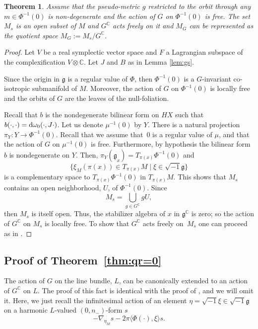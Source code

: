 \documentclass[pdftex]{sigma}
\numberwithin{equation}{section}
\newtheorem{Theorem}{Theorem}[section]
\begin{document}
 	\begin{Theorem}
 		Assume that the pseudo-metric $g$ restricted to the orbit through any $m\in \Phi^{-1}(0)$ is non-degenerate and the action of $G$ on $\Phi^{-1}(0)$ is free.
 		The set $M_s$ is an open subset of $M$ and $G^{\mathbb{C}}$ acts freely on it and $M_G$ can be represented as the quotient space $M_G:=M_s/G^{\mathbb{C}}$.
 	\end{Theorem}
 	\begin{proof}
 		Let $V$ be a real symplectic vector space and $F$ a	Lagrangian subspace of the complexification $V\otimes \mathbb{C}$. Let $J$ and $B$ as in Lemma \ref{lem:gs}.

 		Since the origin in $\mathfrak{g}$ is a regular value of $\Phi$, then $\Phi^{-1}(0)$ is a $G$-invariant co-isotropic submanifold of $M$. Moreover, the action of $G$ on $\Phi^{-1}(0)$ is locally free and the orbits of $G$ are the leaves of the null-foliation.
 		
 		Recall that $b$ is the nondegenerate bilinear form on $HX$ such that
$b(\cdot , \cdot) = {\rm d}\omega_0(\cdot , J\cdot)$.
 		Let us denote $\mu^{-1}(0)$ by $Y$. There is a natural projection $\pi_Y \colon Y\rightarrow \Phi^{-1}(0)$. Recall that we assume that~$0$ is a regular value of $\mu$, and that the action of $G$ on $\mu^{-1}(0)$ is free. Furthermore, by hypothesis the bilinear form~$b$ is nondegenerate on $Y$. Then,
 		$\pi_Y(\underline{\mathfrak{g}}_x)=T_{\pi(x)}\Phi^{-1}(0) $
 		and
 		\[\big\{{\xi}_M(\pi(x))\in T_{\pi(x)}M \mid \xi\in \sqrt{-1} \mathfrak{g} \big\} \]
 		is a complementary space to $T_{\pi(x)}\Phi^{-1}(0)$ in $T_{\pi(x)}M$. This shows that $M_s$ contains an
 		open neighborhood, $U$, of $\Phi^{-1}(0)$. Since
 		\[M_s=\bigcup_{g\in G^{\mathbb{C}} } g U,\]
 		then $M_s$ is itself open. Thus, the stabilizer algebra of $x$ in $\mathfrak{g}^{\mathbb{C}}$ is zero; so the action of $G^{\mathbb{C}}$ on $M_s$ is locally free. To show that $G^{\mathbb{C}}$ acts freely on~$M_s$ one can proceed as in \cite[the second part of Theorem 4.5, p.~527]{gs}.
 	\end{proof}

 	\subsection[Proof of Theorem \ref{thm:qr=0}]{Proof of Theorem~\ref{thm:qr=0}}
 	\label{sec:proofof1.2}
 	
 	The action of $G$ on the line bundle, $L$, can be canonically extended to an action of $G^{\mathbb{C}}$ on $L$. The proof of this fact is identical with the proof of \cite[Theorem 5.1]{gs}, and we will omit it. Here, we just recall the infinitesimal action of an element $\eta=\sqrt{-1} \xi\in \sqrt{-1}\mathfrak{g}$ on a harmonic $L$-valued $(0,n_-)$-form $s$
 	\begin{equation} \label{eq:5.3}
 		-\nabla_{\eta_M} s-2\pi \langle\Phi(\cdot), {\xi}\rangle s .
 	\end{equation}
 	
\end{document}
